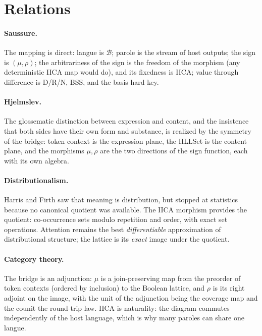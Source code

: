 \documentclass[11pt,a4paper]{article}
\theoremstyle{remark}
\newcommand{\Lat}{\ensuremath{\mathcal{B}}}              %
\newcommand{\Ing}{\ensuremath{\mu}}                      %
\newcommand{\Mat}{\ensuremath{\rho}}                     %
\begin{document}
\section{Relations}
\label{sec:relations}

\paragraph{Saussure.} The mapping is direct: langue is $\Lat$; parole is the
stream of host outputs; the sign is $(\Ing, \Mat)$; the arbitrariness of the
sign is the freedom of the morphism (any deterministic IICA map would do), and
its fixedness is IICA; value through difference is D/R/N, BSS, and the basis
hard key.

\paragraph{Hjelmslev.} The glossematic distinction between expression and
content, and the insistence that both sides have their own form and substance,
is realized by the symmetry of the bridge: token context is the expression
plane, the HLLSet is the content plane, and the morphisms $\Ing, \Mat$ are the
two directions of the sign function, each with its own algebra.

\paragraph{Distributionalism.} Harris and Firth saw that meaning is
distribution, but stopped at statistics because no canonical quotient was
available. The IICA morphism provides the quotient: co-occurrence sets modulo
repetition
and order, with exact set operations. Attention remains the best
\emph{differentiable} approximation of distributional structure; the lattice
is its \emph{exact} image under the quotient.

\paragraph{Category theory.} The bridge is an adjunction: $\Ing$ is a
join-preserving map from the preorder of token contexts (ordered by inclusion)
to the Boolean lattice, and $\Mat$ is its right adjoint on the image, with the
unit of the adjunction being the coverage map and the counit the round-trip
law. IICA is naturality: the diagram commutes independently of the host
language, which is why many paroles can share one langue.
\end{document}
